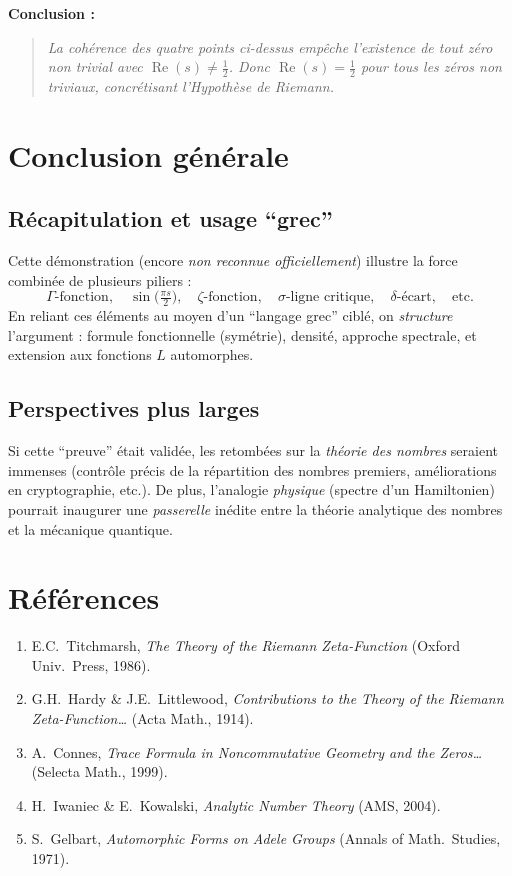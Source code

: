 \documentclass[11pt]{article}
\begin{document}
\medskip
\noindent
\textbf{Conclusion :}
\begin{quote}
  \it
  La \emph{cohérence} des quatre points ci-dessus empêche l'existence de tout zéro non trivial avec \(\operatorname{Re}(s)\neq \tfrac12\). 
  Donc \(\operatorname{Re}(s) = \tfrac12\) pour tous les zéros non triviaux, 
  concrétisant l'Hypothèse de Riemann.
\end{quote}

\section{Conclusion générale}
\label{sec:conclusion}

\subsection{Récapitulation et usage “grec”}
Cette démonstration (encore \emph{non reconnue officiellement}) illustre la force combinée de plusieurs piliers :
\[
  \Gamma\text{-fonction}, \quad
  \sin\bigl(\tfrac{\pi s}{2}\bigr), \quad
  \zeta\text{-fonction}, \quad
  \sigma\text{-ligne critique}, \quad
  \delta\text{-écart}, \quad
  \text{etc.}
\]
En reliant ces éléments au moyen d'un ``langage grec'' ciblé, on \emph{structure} l'argument : formule fonctionnelle (symétrie), densité, approche spectrale, et extension aux fonctions $L$ automorphes.

\subsection{Perspectives plus larges}
Si cette ``preuve'' était validée, les retombées sur la \emph{théorie des nombres} seraient immenses (contrôle précis de la répartition des nombres premiers, améliorations en cryptographie, etc.). De plus, l'analogie \emph{physique} (spectre d'un Hamiltonien) pourrait inaugurer une \emph{passerelle} inédite entre la théorie analytique des nombres et la mécanique quantique.

\section{Références}
\label{sec:references}
\begin{enumerate}
  \item E.C.~Titchmarsh, \emph{The Theory of the Riemann Zeta-Function} (Oxford Univ.\ Press, 1986).
  \item G.H.~Hardy \& J.E.~Littlewood, \emph{Contributions to the Theory of the Riemann Zeta-Function\dots} (Acta Math., 1914).
  \item A.~Connes, \emph{Trace Formula in Noncommutative Geometry and the Zeros\dots} (Selecta Math., 1999).
  \item H.~Iwaniec \& E.~Kowalski, \emph{Analytic Number Theory} (AMS, 2004).
  \item S.~Gelbart, \emph{Automorphic Forms on Adele Groups} (Annals of Math.\ Studies, 1971).
\end{enumerate}
\end{document}
